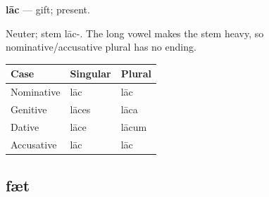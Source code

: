 \par\begin{minipage}{\linewidth}\raggedright
\textbf{lāc} — gift; present.

Neuter; stem lāc-. The long vowel makes the stem heavy, so nominative/\allowbreak{}accusative plural has no ending.

\par\begingroup
\fontsize{10.5}{13.2}\selectfont
\setlength{\LTleft}{0pt}\setlength{\LTright}{\fill}
\noindent
\begin{tabular}{@{}>{\raggedright\arraybackslash}p{39.46mm}>{\raggedright\arraybackslash}p{39.46mm}>{\raggedright\arraybackslash}p{39.46mm}@{}}
\toprule
\textbf{Case} & \textbf{Singular} & \textbf{Plural} \\
\midrule
Nominative & lāc & lāc \\
Genitive & lāces & lāca \\
Dative & lāce & lācum \\
Accusative & lāc & lāc \\
\bottomrule
\end{tabular}
\par\endgroup

\end{minipage}\par
{}
\subsection*{fæt}

